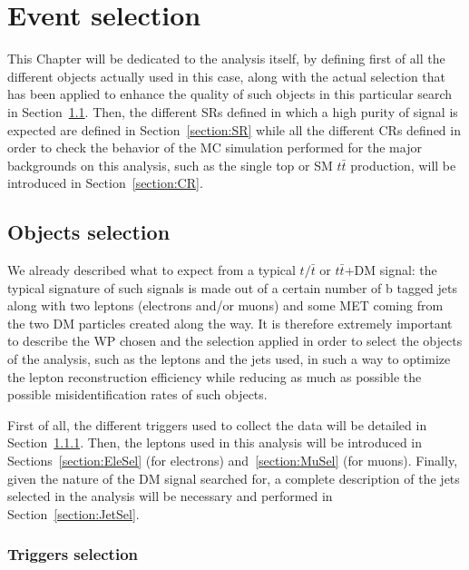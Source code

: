\documentclass[a4paper, 10pt, openright]{report}
\begin{document}
\chapter{Event selection} \label{chapter:Selection}

This Chapter will be dedicated to the analysis itself, by defining first of all the different objects actually used in this case, along with the actual selection that has been applied to enhance the quality of such objects in this particular search in Section~\ref{section:Selection}. Then, the different \acfp{SR} defined in which a high purity of signal is expected are defined in Section~\ref{section:SR} while all the different \acfp{CR} defined in order to check the behavior of the \ac{MC} simulation performed for the major backgrounds on this analysis, such as the single top or \ac{SM} $t \bar t$ production, will be introduced in Section~\ref{section:CR}. 

\section{Objects selection} \label{section:Selection}

We already described what to expect from a typical $t/\bar t$ or $t \bar t$+DM signal: the typical signature of such signals is made out of a certain number of b tagged jets along with two leptons (electrons and/or muons) and some \ac{MET} coming from the two \ac{DM} particles created along the way. It is therefore extremely important to describe the \ac{WP} chosen and the selection applied in order to select the objects of the analysis, such as the leptons and the jets used, in such a way to optimize the lepton reconstruction efficiency while reducing as much as possible the possible misidentification rates of such objects.

First of all, the different triggers used to collect the data will be detailed in Section~\ref{section:Triggers}. Then, the leptons used in this analysis will be introduced in Sections~\ref{section:EleSel} (for electrons) and~\ref{section:MuSel} (for muons). Finally, given the nature of the \ac{DM} signal searched for, a complete description of the jets selected in the analysis will be necessary and performed in Section~\ref{section:JetSel}.

\subsection{Triggers selection} \label{section:Triggers}
\end{document}
